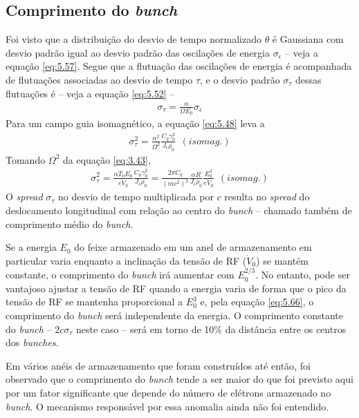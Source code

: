 \subsection{Comprimento do \textit{bunch}}
Foi visto que a distribuição do desvio de tempo normalizado $\theta$ é Gaussiana com desvio padrão igual ao desvio padrão das oscilações de energia $\sigma_\epsilon$ -- veja a equação \eqref{eq:5.57}. Segue que a flutuação das oscilações de energia é acompanhada de flutuações associadas ao desvio de tempo $\tau$, e o desvio padrão $\sigma_\tau$ dessas flutuações é -- veja a equação \eqref{eq:5.52} --
\begin{align}
	\sigma_\tau = \frac{\alpha}{\Omega E_0}\sigma_\epsilon
\end{align}
Para um campo guia isomagnético, a equação \eqref{eq:5.48} leva a
\begin{align}
	\sigma_\tau^2 = \frac{\alpha^2}{\Omega^2} \frac{C_q \gamma_0^2}{J_\epsilon \rho_0}\ \ (isomag.)
\end{align}
Tomando $\Omega^2$ da equação \eqref{eq:3.43},
\begin{align}
	\sigma_\tau^2 = \frac{\alpha T_0 E_0}{e \dot{V}_0}\frac{C_q \gamma_0^2}{J_\epsilon \rho_0} = \frac{2\pi C_q}{(mc^2)^2}\frac{\alpha R}{J_\epsilon \rho_0}\frac{E_0^3}{e \dot{V}_0}\ \ (isomag.)\label{eq:5.66}
\end{align}
O \textit{spread} $\sigma_\tau$ no desvio de tempo multiplicada por $c$ resulta no \textit{spread} do deslocamento longitudinal com relação ao centro do \textit{bunch} -- chamado também de comprimento médio do \textit{bunch}.

Se a energia $E_0$ do feixe armazenado em um anel de armazenamento em particular varia enquanto a inclinação da tensão de RF ($\dot{V}_0$) se mantém constante, o comprimento do \textit{bunch} irá aumentar com $E_0^{2/3}$. No entanto, pode ser vantajoso ajustar a tensão de RF quando a energia varia de forma que o pico da tensão de RF se mantenha proporcional a $E_0^3$ e, pela equação \eqref{eq:5.66}, o comprimento do \textit{bunch} será independente da energia. O comprimento constante do \textit{bunch} -- $2c\sigma_\tau$ neste caso -- será em torno de 10\% da distância entre os centros dos \textit{bunches}.

Em vários anéis de armazenamento que foram construídos até então, foi observado que o comprimento do \textit{bunch} tende a ser maior do que foi previsto aqui por um fator significante que depende do número de elétrons armazenado no \textit{bunch}. O mecanismo responsável por essa anomalia ainda não foi entendido.